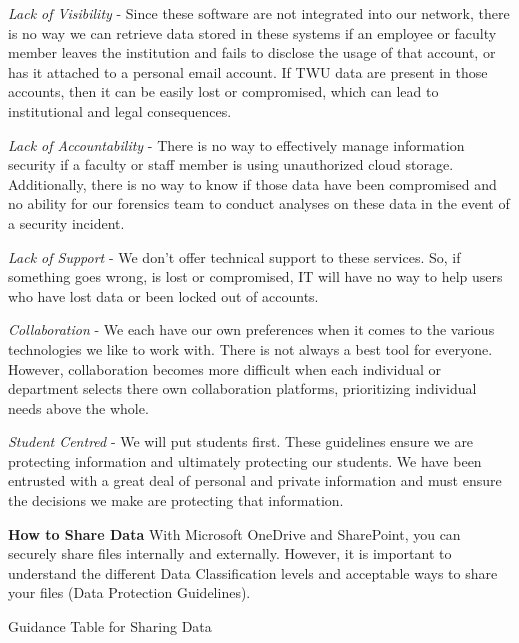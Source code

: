 \documentclass[
]{book}
\theoremstyle{definition}
\theoremstyle{definition}
\theoremstyle{definition}
\theoremstyle{definition}
\theoremstyle{remark}
\begin{document}
\emph{Lack of Visibility} - Since these software are not integrated into our network, there is no way we can retrieve data stored in these systems if an employee or faculty member leaves the institution and fails to disclose the usage of that account, or has it attached to a personal email account. If TWU data are present in those accounts, then it can be easily lost or compromised, which can lead to institutional and legal consequences.

\emph{Lack of Accountability} - There is no way to effectively manage information security if a faculty or staff member is using unauthorized cloud storage. Additionally, there is no way to know if those data have been compromised and no ability for our forensics team to conduct analyses on these data in the event of a security incident.

\emph{Lack of Support} - We don't offer technical support to these services. So, if something goes wrong, is lost or compromised, IT will have no way to help users who have lost data or been locked out of accounts.

\emph{Collaboration} - We each have our own preferences when it comes to the various technologies we like to work with. There is not always a best tool for everyone. However, collaboration becomes more difficult when each individual or department selects there own collaboration platforms, prioritizing individual needs above the whole.

\emph{Student Centred} - We will put students first. These guidelines ensure we are protecting information and ultimately protecting our students. We have been entrusted with a great deal of personal and private information and must ensure the decisions we make are protecting that information.

\textbf{How to Share Data}
With Microsoft OneDrive and SharePoint, you can securely share files internally and externally. However, it is important to understand the different Data Classification levels and acceptable ways to share your files (Data Protection Guidelines).

Guidance Table for Sharing Data
\end{document}
